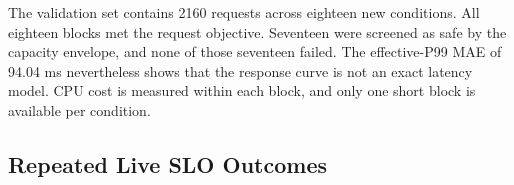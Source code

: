 \documentclass[10pt,twocolumn,a4paper]{article}
\begin{document}
\begin{table}[t]\centering\small\setlength{\tabcolsep}{3pt}
\caption{Response-model checks on eighteen additional combinations of load, work and replica count. CPU cost comes from measurements in each block.}\label{tab:fidelity}
\ifdim\wd\databox>\columnwidth\relax\resizebox{\columnwidth}{!}{\usebox{\databox}}\else\usebox{\databox}\fi
\end{table}

The validation set contains 2160 requests across eighteen new conditions. All eighteen blocks met the request objective. Seventeen were screened as safe by the capacity envelope, and none of those seventeen failed. The effective-P99 MAE of 94.04 ms nevertheless shows that the response curve is not an exact latency model. CPU cost is measured within each block, and only one short block is available per condition.

\subsection{Repeated Live SLO Outcomes}
\end{document}
